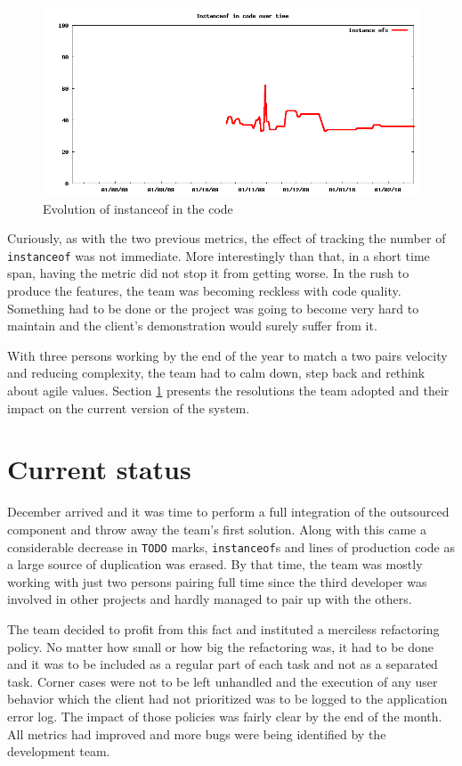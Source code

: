 \documentclass[lnbip]{svmultln}
\begin{document}
\begin{figure}[hbt]
  \centerline{
    \includegraphics[width=120mm]{InstanceOfs.png}
  }
  \caption{Evolution of instanceof in the code }
  \label{fig:InstanceOfs}
\end{figure}

Curiously, as with the two previous metrics, the effect of tracking
the number of \texttt{instanceof} was not immediate. More
interestingly than that, in a short time span, having the metric did
not stop it from getting worse. In the rush to produce the features,
the team was becoming reckless with code quality.  Something had to be
done or the project was going to become very hard to maintain and the
client's demonstration would surely suffer from it.

With three persons working by the end of the year to match a two pairs
velocity and reducing complexity, the team had to calm down, step back
and rethink about agile values. Section \ref{sec:nowadays} presents
the resolutions the team adopted and their impact on the current
version of the system.

\section{Current status}
\label{sec:nowadays}

December arrived and it was time to perform a full integration of the
outsourced component and throw away the team's first solution. Along
with this came a considerable decrease in \texttt{TODO} marks,
\texttt{instanceof}s and lines of production code as a large source of
duplication was erased. By that time, the team was mostly working with
just two persons pairing full time since the third developer was
involved in other projects and hardly managed to pair up with the
others.

The team decided to profit from this fact and instituted a merciless
refactoring policy. No matter how small or how big the refactoring
was, it had to be done and it was to be included as a regular part of
each task and not as a separated task. Corner cases were not to be
left unhandled and the execution of any user behavior which the client
had not prioritized was to be logged to the application error log. The
impact of those policies was fairly clear by the end of the month. All
metrics had improved and more bugs were being identified by the
development team.
\end{document}
